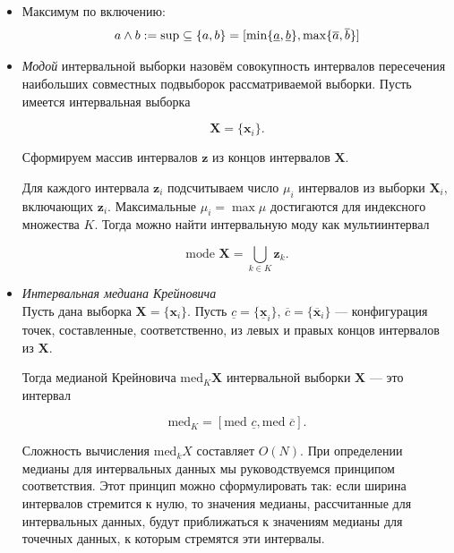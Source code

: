 \documentclass[10pt]{article}
\begin{document}
\begin{itemize}
\item Максимум по включению:
\begin{equation}
    a \wedge b := \sup \subseteq \{ a, b \} = [\min\{\underline{a}, \underline{b}\}, \max\{\overline{a}, \overline{b}\}] \\
\end{equation}


 \item \textit{Модой} интервальной выборки назовём совокупность интервалов пересечения наибольших совместных подвыборок рассматриваемой выборки.
 Пусть имеется интервальная выборка

  \[
    \mathbf{X} = \{ \mathbf{x}_i \}.
  \]

  Сформируем массив интервалов \( \mathbf{z} \) из концов интервалов
  \( \mathbf{X} \).

  Для каждого интервала \( \mathbf{z}_i \) подсчитываем число \( \mu_i \)
  интервалов из выборки \( \mathbf{X}_i \), включающих \( \mathbf{z}_i \).
  Максимальные \( \mu_i = \max \mu \) достигаются для индексного множества
  \( K \). Тогда можно найти интервальную моду как мультиинтервал

  \begin{equation*}
    \text{mode } \mathbf{X} = \bigcup_{k \in K} \mathbf{z}_k.
  \end{equation*}

 \item \textit{Интервальная медиана Крейновича}\\

   Пусть дана выборка \( \mathbf{X} = \{ \mathbf{x}_i \} \). Пусть
  \( \underline c = \{ \underline{\mathbf{x}}_i \} \),
  \( \overline c = \{ \overline{\mathbf{x}}_i \} \) --- конфигурация
  точек, составленные, соответственно, из левых и правых концов интервалов
  из \( \mathbf{X} \).

  Тогда медианой Крейновича \( \text{med}_K \mathbf{X} \) интервальной
  выборки \( \mathbf{X} \) --- это интервал

  \begin{equation*}
    \text{med}_K = [\text{med } \underline c, \text{med } \overline c].
  \end{equation*}

Сложность вычисления \( \text{med}_k X \) составляет \( O(N) \). При определении медианы для интервальных данных мы руководствуемся принципом соответствия. Этот принцип можно сформулировать так: если ширина интервалов стремится к нулю, то значения медианы, рассчитанные для интервальных данных, будут приближаться к значениям медианы для точечных данных, к которым стремятся эти интервалы.


\end{itemize}
\end{document}
